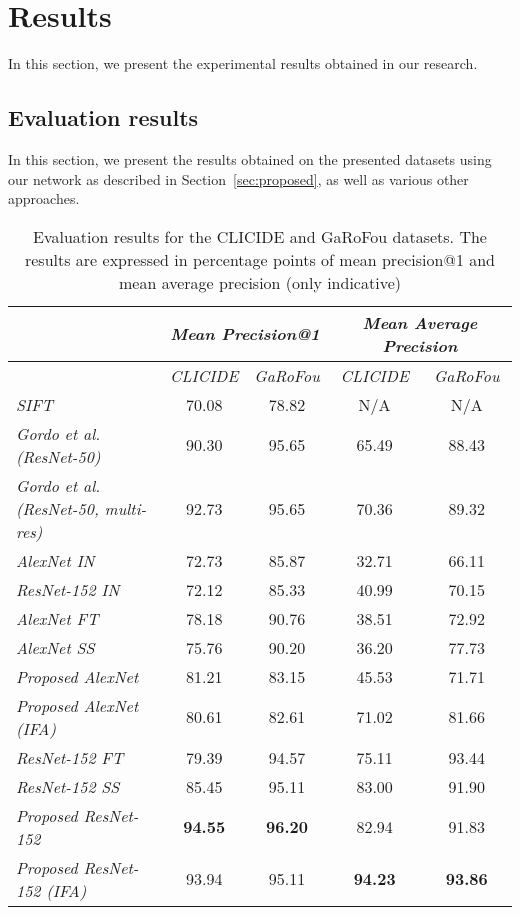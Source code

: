 
\chapter{Results}\label{chap:results}
In this section, we present the experimental results obtained in our
research.

\section{Evaluation results}\label{sec:evalresults}
In this section, we present the results obtained on the presented datasets
using our network as described in Section~\ref{sec:proposed}, as well
as various other approaches.

\begin{table}
\centering
\begin{tabular}{|l|c|c||c|c|}
\hline & \multicolumn{2}{c||}{\emph{Mean Precision@1}} &
\multicolumn{2}{c|}{\emph{Mean Average Precision}}\\
\hline & \emph{CLICIDE} & \emph{GaRoFou} & \emph{CLICIDE} & \emph{GaRoFou}\\
\hline \emph{SIFT} & 70.08 & 78.82 & N/A & N/A\\
\hline \emph{Gordo et al.~\cite{gordo_deep_2016} (ResNet-50)}
& 90.30 & 95.65 & 65.49 & 88.43\\
\hline \emph{Gordo et al.~\cite{gordo_deep_2016} (ResNet-50, multi-res)}
& 92.73 & 95.65 & 70.36 & 89.32\\
\hline \emph{AlexNet IN} & 72.73 & 85.87 & 32.71 & 66.11\\
\hline \emph{ResNet-152 IN} & 72.12 & 85.33 & 40.99 & 70.15\\
\hline
\hline \emph{AlexNet FT} & 78.18 & 90.76 & 38.51 & 72.92\\
\hline \emph{AlexNet SS} & 75.76 & 90.20 & 36.20 & 77.73\\
\hline \emph{Proposed AlexNet} & 81.21 & 83.15 & 45.53 & 71.71\\
\hline \emph{Proposed AlexNet (IFA)} & 80.61 & 82.61 & 71.02 & 81.66\\
\hline \emph{ResNet-152 FT} & 79.39 & 94.57 & 75.11 & 93.44\\
\hline \emph{ResNet-152 SS} & 85.45 & 95.11 & 83.00 & 91.90\\
\hline \emph{Proposed ResNet-152} & \textbf{94.55} & \textbf{96.20}
& 82.94 & 91.83\\
\hline \emph{Proposed ResNet-152 (IFA)} & 93.94 & 95.11
& \textbf{94.23} & \textbf{93.86}\\
\hline
\end{tabular}
\caption{Evaluation results for the CLICIDE and GaRoFou datasets.
The results are expressed in percentage points of
mean precision@1 and mean average precision (only indicative)
\label{tab:results}}
\end{table}

